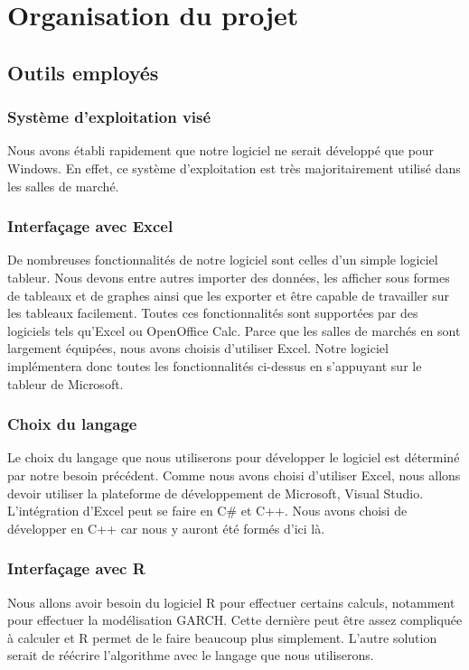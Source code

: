 \chapter{Organisation du projet}

\section{Outils employés}

\subsection{Système d'exploitation visé}
	Nous avons établi rapidement que notre logiciel ne serait développé que pour Windows. En effet, ce système d'exploitation est très majoritairement utilisé dans les salles de marché.


\subsection{Interfaçage avec Excel}
	De nombreuses fonctionnalités de notre logiciel sont celles d'un simple logiciel tableur. Nous devons entre autres importer des données, les afficher sous formes de tableaux et de graphes ainsi que les exporter et être capable de travailler sur les tableaux facilement. Toutes ces fonctionnalités sont supportées par des logiciels tels qu'Excel ou OpenOffice Calc.
	Parce que les salles de marchés en sont largement équipées, nous avons choisis d'utiliser Excel. Notre logiciel implémentera donc toutes les fonctionnalités ci-dessus en s'appuyant sur le tableur de Microsoft.


\subsection{Choix du langage}
	Le choix du langage que nous utiliserons pour développer le logiciel est déterminé par notre besoin précédent. Comme nous avons choisi d'utiliser Excel, nous allons devoir utiliser la plateforme de développement de Microsoft, Visual Studio. L'intégration d'Excel peut se faire en C\# et C++. Nous avons choisi de développer en C++ car nous y auront été formés d'ici là.


\subsection{Interfaçage avec R}
	Nous allons avoir besoin du logiciel R pour effectuer certains calculs, notamment pour effectuer la modélisation GARCH. Cette dernière peut être assez compliquée à calculer et R permet de le faire beaucoup plus simplement. L'autre solution serait de réécrire l'algorithme avec le langage que nous utiliserons.

